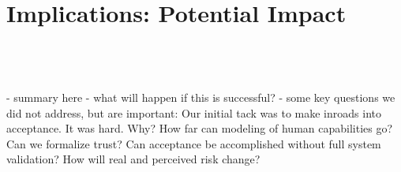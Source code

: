 
\section*{Implications: Potential Impact}

 \\
 \\
 \\

- summary here
- what will happen if this is successful?
- some key questions we did not address, but are important:
Our initial tack was to make inroads into acceptance.  It was hard.  Why?
How far can modeling of human capabilities go? 
Can we formalize trust?
Can acceptance be accomplished without full system validation?
How will real and perceived risk change?

